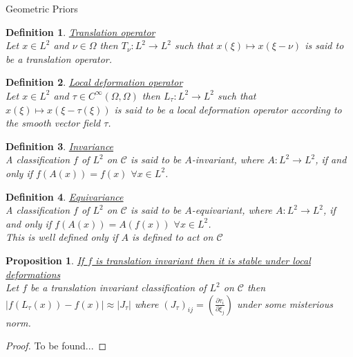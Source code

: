 \documentclass{article}
\newtheorem{prop}[thm]{Proposition}
\newtheorem{defn}{Definition}[section]
\newcommand{\pder}[2]{\frac{\partial #1}{\partial #2}}
\begin{document}
\begin{section}{Geometric Priors}
\begin{defn}\underline{Translation operator}\\
Let $x \in L^2$ and $\nu \in \Omega$ then $T_\nu:L^2 \to L^2$ such that $x(\xi) \mapsto x(\xi - \nu)$
is said to be a translation operator.
\end{defn}

\begin{defn}\underline{Local deformation operator}\\
Let $x \in L^2$ and $\tau \in C^\infty(\Omega,\Omega)$ then $L_\tau:L^2 \to L^2$ such that $x(\xi) \mapsto x(\xi-\tau(\xi))$
is said to be a local deformation operator according to the smooth vector field $\tau$.
\end{defn}

\begin{defn}\underline{Invariance}\\
A classification $f$ of $L^2$ on $\mathcal{C}$ is said to be $A$-invariant, where
$A:L^2 \to L^2$, if and only if $f(A(x))=f(x)$  $\forall x \in L^2$.
\end{defn}

\begin{defn}\underline{Equivariance}\\
A classification $f$ of $L^2$ on $\mathcal{C}$ is said to be $A$-equivariant, where
$A:L^2 \to L^2$, if and only if $f(A(x))=A(f(x))$  $\forall x \in L^2$.\\
This is well defined only if $A$ is defined to act on $\mathcal{C}$
\end{defn}

\begin{prop}\underline{If $f$ is translation invariant then it is stable under local deformations}\\
Let $f$ be a translation invariant classification of $L^2$ on $\mathcal{C}$
then $|f(L_\tau(x))-f(x)|\approx |J_\tau|$ where $(J_\tau)_{ij}=(\pder{\tau_i}{\xi_j})$ under some misterious norm.
\end{prop}
\begin{proof}
To be found...
\end{proof}

\end{section}
\end{document}
